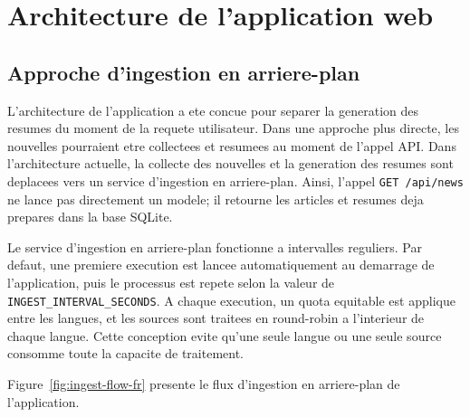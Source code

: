 \section{Architecture de l'application web}

\subsection{Approche d'ingestion en arriere-plan}

L'architecture de l'application a ete concue pour separer la generation des resumes du moment de la requete utilisateur. Dans une approche plus directe, les nouvelles pourraient etre collectees et resumees au moment de l'appel API. Dans l'architecture actuelle, la collecte des nouvelles et la generation des resumes sont deplacees vers un service d'ingestion en arriere-plan. Ainsi, l'appel \texttt{GET /api/news} ne lance pas directement un modele; il retourne les articles et resumes deja prepares dans la base SQLite.

Le service d'ingestion en arriere-plan fonctionne a intervalles reguliers. Par defaut, une premiere execution est lancee automatiquement au demarrage de l'application, puis le processus est repete selon la valeur de \texttt{INGEST\_INTERVAL\_SECONDS}. A chaque execution, un quota equitable est applique entre les langues, et les sources sont traitees en round-robin a l'interieur de chaque langue. Cette conception evite qu'une seule langue ou une seule source consomme toute la capacite de traitement.

Figure~\ref{fig:ingest-flow-fr} presente le flux d'ingestion en arriere-plan de l'application.


